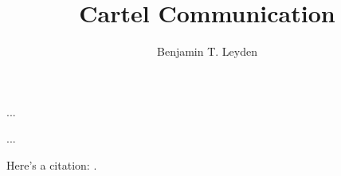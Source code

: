 \documentclass[11pt, aspectratio=169, handout]{beamer}
\title[]{Cartel Communication}
\author[Leyden]{Benjamin T. Leyden}
\institute{
	SC Johnson College of Business\\
	Cornell University\\

	\begin{tabular}{@{}ll}
	twitter: & {\href{https://www.twitter.com/btleyden}{@btleyden}}\\
	email: & {\href{mailto:leyden@cornell.edu}{leyden@cornell.edu}}\\
	\end{tabular}
}
\begin{document}
\maketitle


\begin{frame}{...}

...

Here's a citation: \citep{Anderson1991}.

\end{frame}




\end{document}
